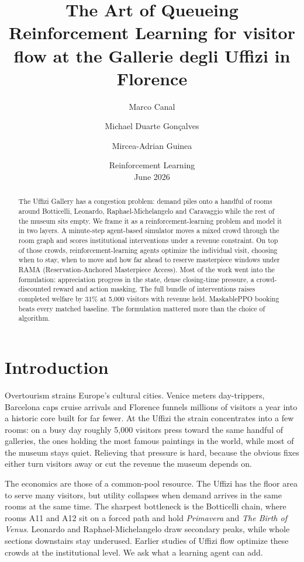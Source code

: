 \documentclass[11pt]{article}
\title{\textbf{The Art of Queueing}\\
\large Reinforcement Learning for visitor flow at the Gallerie degli Uffizi in Florence}
\author{Marco Canal \and Michael Duarte Gon\c{c}alves \and Mircea-Adrian Guinea}
\date{Reinforcement Learning \\ June 2026}
\begin{document}
\maketitle

\begin{abstract}
The Uffizi Gallery has a congestion problem: demand piles onto a handful of rooms around Botticelli,
Leonardo, Raphael-Michelangelo and Caravaggio while the rest of the museum sits empty. We frame it as a
reinforcement-learning problem and model it in two layers. A minute-step agent-based simulator moves a mixed crowd
through the room graph and scores institutional interventions under a revenue constraint. On top of
those crowds, reinforcement-learning agents optimize the individual visit, choosing when to stay, when
to move and how far ahead to reserve masterpiece windows under RAMA (Reservation-Anchored Masterpiece
Access). Most of the work went into the formulation: appreciation progress in the state, dense
closing-time pressure, a crowd-discounted reward and action masking. The full bundle of interventions
raises completed welfare by 31\% at 5,000 visitors with revenue held. MaskablePPO booking beats every
matched baseline. The formulation mattered more than the choice of algorithm.
\end{abstract}

\section{Introduction}

Overtourism strains Europe's cultural cities. Venice meters day-trippers, Barcelona caps cruise arrivals
and Florence funnels millions of visitors a year into a historic core built for far fewer. At the Uffizi
the strain concentrates into a few rooms: on a busy day roughly 5,000 visitors press toward the same
handful of galleries, the ones holding the most famous paintings in the world, while most of the museum
stays quiet. Relieving that pressure is hard, because the obvious fixes either turn visitors away or cut
the revenue the museum depends on.

The economics are those of a common-pool resource. The Uffizi has the floor area to serve many
visitors, but utility collapses when demand arrives in the same rooms at the same time. The sharpest
bottleneck is the Botticelli chain, where rooms A11 and A12 sit on a forced path and hold
\emph{Primavera} and \emph{The Birth of Venus}. Leonardo and Raphael-Michelangelo draw secondary peaks,
while whole sections downstairs stay underused. Earlier studies of Uffizi flow
\cite{attanasio2022,centorrino2021} optimize these crowds at the institutional level. We ask what a
learning agent can add.
\end{document}
